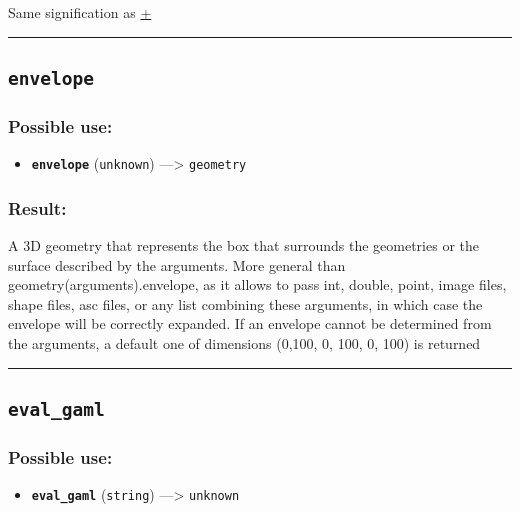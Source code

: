 \documentclass[]{book}
\providecommand{\tightlist}{%
  \setlength{\itemsep}{0pt}\setlength{\parskip}{0pt}}
\theoremstyle{definition}
\theoremstyle{definition}
\theoremstyle{definition}
\theoremstyle{remark}
\begin{document}
Same signification as \href{operators-a-to-a.html\#+}{+}

\begin{center}\rule{0.5\linewidth}{\linethickness}\end{center}

\subsection{\texorpdfstring{\texttt{envelope}}{envelope}}\label{envelope}

\subsubsection{Possible use:}\label{possible-use-153}

\begin{itemize}
\tightlist
\item
  \textbf{\texttt{envelope}} (\texttt{unknown}) ---\textgreater{}
  \texttt{geometry}
\end{itemize}

\subsubsection{Result:}\label{result-147}

A 3D geometry that represents the box that surrounds the geometries or
the surface described by the arguments. More general than
geometry(arguments).envelope, as it allows to pass int, double, point,
image files, shape files, asc files, or any list combining these
arguments, in which case the envelope will be correctly expanded. If an
envelope cannot be determined from the arguments, a default one of
dimensions (0,100, 0, 100, 0, 100) is returned

\begin{center}\rule{0.5\linewidth}{\linethickness}\end{center}

\subsection{\texorpdfstring{\texttt{eval\_gaml}}{eval\_gaml}}\label{eval_gaml}

\subsubsection{Possible use:}\label{possible-use-154}

\begin{itemize}
\tightlist
\item
  \textbf{\texttt{eval\_gaml}} (\texttt{string}) ---\textgreater{}
  \texttt{unknown}
\end{itemize}
\end{document}
